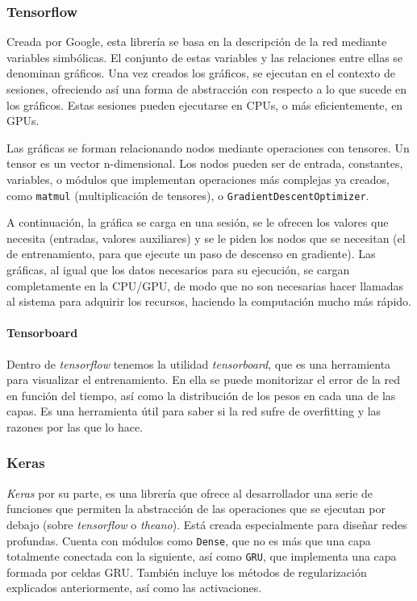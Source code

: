 \subsubsection{Tensorflow}
Creada por Google, esta librería se basa en la descripción de la red mediante variables simbólicas. El conjunto de estas variables y las relaciones entre ellas se denominan gráficos. Una vez creados los gráficos, se ejecutan en el contexto de sesiones, ofreciendo así una forma de abstracción con respecto a lo que sucede en los gráficos. Estas sesiones pueden ejecutarse en CPUs, o más eficientemente, en GPUs.

Las gráficas se forman relacionando nodos mediante operaciones con tensores. Un tensor es un vector n-dimensional. Los nodos pueden ser de entrada, constantes, variables, o módulos que implementan operaciones más complejas ya creados, como \texttt{matmul} (multiplicación de tensores), o \texttt{Gradient\-Descent\-Optimizer}.

A continuación, la gráfica se carga en una sesión, se le ofrecen los valores que necesita (entradas, valores auxiliares) y se le piden los nodos que se necesitan (el de entrenamiento, para que ejecute un paso de descenso en gradiente). Las gráficas, al igual que los datos necesarios para su ejecución, se cargan completamente en la CPU/GPU, de modo que no son necesarias hacer llamadas al sistema para adquirir los recursos, haciendo la computación mucho más rápido.
\paragraph{Tensorboard}
Dentro de \textit{tensorflow} tenemos la utilidad \textit{tensorboard}, que es una herramienta para visualizar el entrenamiento. En ella se puede monitorizar el error de la red en función del tiempo, así como la distribución de los pesos en cada una de las capas. Es una herramienta útil para saber si la red sufre de overfitting y las razones por las que lo hace.

\subsubsection{Keras}
\textit{Keras} por su parte, es una librería que ofrece al desarrollador una serie de funciones que permiten la abstracción de las operaciones que se ejecutan por debajo (sobre \textit{tensorflow} o \textit{theano}). Está creada especialmente para diseñar redes profundas. Cuenta con módulos como \texttt{Dense}, que no es más que una capa totalmente conectada con la siguiente, así como \texttt{GRU}, que implementa una capa formada por celdas GRU. También incluye los métodos de regularización explicados anteriormente, así como las activaciones.

